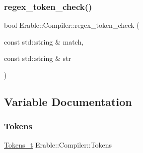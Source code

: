 \subsubsection{\texorpdfstring{regex\_token\_check()}{regex\_token\_check()}}
{\footnotesize\ttfamily bool Erable\+::\+Compiler\+::regex\+\_\+token\+\_\+check (\begin{DoxyParamCaption}\item[{const std\+::string \&}]{match,  }\item[{const std\+::string \&}]{str }\end{DoxyParamCaption})}



\subsection{Variable Documentation}
\mbox{\label{namespace_erable_1_1_compiler_a6b3163502e436c7fe366b412429d8619}} 
\subsubsection{\texorpdfstring{Tokens}{Tokens}}
{\footnotesize\ttfamily \mbox{\hyperlink{class_erable_1_1_compiler_1_1_tokens__t}{Tokens\+\_\+t}} Erable\+::\+Compiler\+::\+Tokens\hspace{0.3cm}{\ttfamily [inline]}}

